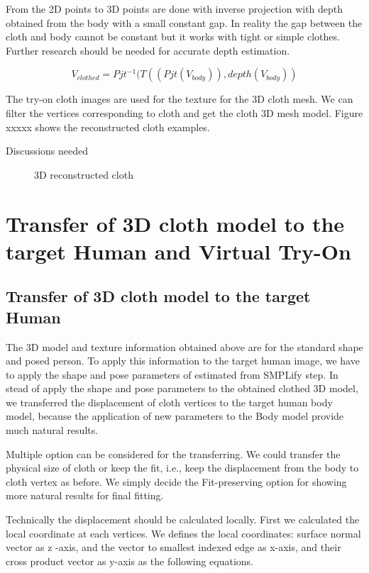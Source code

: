 \documentclass[runningheads]{llncs}
\begin{document}
From the 2D points to 3D points are done with inverse projection with depth obtained from the body with a small constant gap. In reality the gap between the cloth and body cannot be constant but it works with tight or simple clothes. Further research should be needed for accurate depth estimation.   

\begin{equation}
V_{clothed} = Pjt^{-1} ( T( (Pjt(V_{body})), depth(V_{body}) )
\end{equation}


The try-on cloth images are used for the texture for the 3D cloth mesh. We can filter the vertices corresponding to cloth and get the cloth 3D mesh model. Figure xxxxx shows the reconstructed cloth examples. 


Discussions needed


\begin{figure}
\centering
\caption{3D reconstructed cloth}
\label{fig:3DreconstructedCloth}
\end{figure}



\section{Transfer of 3D cloth model to the target Human and Virtual Try-On } 


\subsection{Transfer of 3D cloth model to the target Human} 

The 3D model and texture information obtained above are for the standard shape and posed person. To apply this information to the target human image, we have to apply the shape and pose parameters of estimated from SMPLify step.  In stead of apply the shape and pose parameters to the obtained clothed 3D model, we transferred the displacement of cloth vertices to the target human body model, because the application of new parameters to the Body model provide much natural results.      

Multiple option can be considered for the transferring. We could transfer the physical size of cloth or keep the fit, i.e., keep the displacement from the body to cloth vertex as before.  We simply decide the Fit-preserving option for showing more natural results for final fitting.  

Technically the displacement should be calculated locally. First we calculated the local coordinate at each vertices. We defines the local coordinates: surface normal vector as z -axis, and the vector to smallest indexed edge as x-axis, and their cross product vector as y-axis as the following equations.
 
\end{document}
